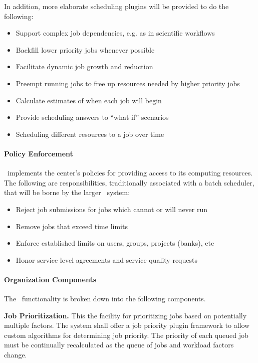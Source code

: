 In addition, more elaborate scheduling plugins will be provided to do
the following:

\begin{itemize}
  \item Support complex job dependencies, e.g. as in scientific workflows
  \item Backfill lower priority jobs whenever possible
  \item Facilitate dynamic job growth and reduction
  \item Preempt running jobs to free up resources needed by higher priority jobs
  \item Calculate estimates of when each job will begin
  \item Provide scheduling answers to ``what if'' scenarios
  \item Scheduling different resources to a job over time
\end{itemize}

\paragraph{Policy Enforcement}

\ngrm\ implements the center's policies for providing access to its
computing resources.  The following are responsibilities,
traditionally associated with a batch scheduler, that will be borne by
the larger \ngrm\ system:

\begin{itemize}
  \item Reject job submissions for jobs which cannot or will never run
  \item Remove jobs that exceed time limits
  \item Enforce established limits on users, groups, projects (banks), etc
  \item Honor service level agreements and service quality requests
\end{itemize}

\paragraph{Organization Components}

The \ngjs\ functionality is broken down into the following components.

\textbf{Job Prioritization.}  This the facility for prioritizing jobs
based on potentially multiple factors.  The system shall offer a job
priority plugin framework to allow custom algorithms for determining
job priority.  The priority of each queued job must be continually
recalculated as the queue of jobs and workload factors change.

